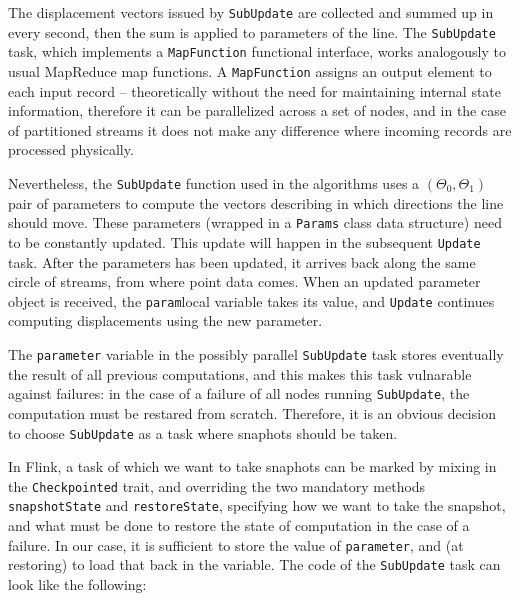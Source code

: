 The displacement vectors issued by \verb:SubUpdate: are collected and summed up in every second, then the sum is applied to parameters of the line. 
The \verb:SubUpdate: task, which implements a \verb|MapFunction| functional interface, works analogously to usual MapReduce map functions. A \verb|MapFunction| assigns an output element to each input record -- theoretically without the need for maintaining internal state information, therefore it can be parallelized across a set of nodes, and in the case of partitioned streams it does not make any difference where incoming records are processed physically.

Nevertheless, the \verb:SubUpdate: function used in the algorithms uses a $(\Theta_0,\Theta_1)$ pair of parameters to compute the vectors describing in which directions the line should move. These parameters (wrapped in a \verb|Params| class data structure) need to be constantly updated. This update will happen in the subsequent \verb|Update| task. After the parameters has been updated, it arrives back along the same circle of streams, from where point data comes. When an updated parameter object is received, the \verb|param|local variable takes its value, and \verb|Update| continues computing displacements using the new parameter.

The \verb|parameter| variable in the possibly parallel \verb:SubUpdate: task stores eventually the result of all previous computations, and this makes this task vulnarable against failures: in the case of a failure of all nodes running \verb:SubUpdate:, the computation must be restared from scratch. Therefore, it is an obvious decision to choose \verb:SubUpdate: as a task where snaphots should be taken.  

In Flink, a task of which we want to take snaphots can be marked by mixing in the \verb|Checkpointed| trait, and overriding the two mandatory methods \verb|snapshotState| and \verb|restoreState|, specifying how we want to take the snapshot, and what must be done to restore the state of computation in the case of a failure. In our case, it is sufficient to store the value of \verb|parameter|, and (at restoring) to load that back in the variable. The code of the \verb:SubUpdate: task can look like the following:

